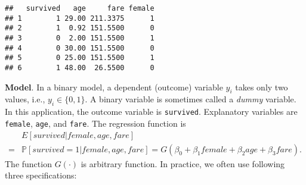 \documentclass[
  12pt,
]{article}
\newenvironment{Shaded}{\begin{snugshade}}{\end{snugshade}}
\newcommand{\DataTypeTok}[1]{\textcolor[rgb]{0.13,0.29,0.53}{#1}}
\newcommand{\DecValTok}[1]{\textcolor[rgb]{0.00,0.00,0.81}{#1}}
\newcommand{\KeywordTok}[1]{\textcolor[rgb]{0.13,0.29,0.53}{\textbf{#1}}}
\newcommand{\NormalTok}[1]{#1}
\newcommand{\OperatorTok}[1]{\textcolor[rgb]{0.81,0.36,0.00}{\textbf{#1}}}
\newcommand{\OtherTok}[1]{\textcolor[rgb]{0.56,0.35,0.01}{#1}}
\newcommand{\StringTok}[1]{\textcolor[rgb]{0.31,0.60,0.02}{#1}}
\begin{document}
\begin{Shaded}
\end{Shaded}

\begin{verbatim}
##   survived   age     fare female
## 1        1 29.00 211.3375      1
## 2        1  0.92 151.5500      0
## 3        0  2.00 151.5500      1
## 4        0 30.00 151.5500      0
## 5        0 25.00 151.5500      1
## 6        1 48.00  26.5500      0
\end{verbatim}

\noindent \textbf{Model}. In a binary model, a dependent (outcome)
variable \(y_i\) takes only two values, i.e., \(y_i \in \{0, 1\}\). A
binary variable is sometimes called a \emph{dummy} variable. In this
application, the outcome variable is \texttt{survived}. Explanatory
variables are \texttt{female}, \texttt{age}, and \texttt{fare}. The
regression function is \begin{equation*}
  \begin{split}
    &E[survived | female, age, fare] \\
    =& \mathbb{P}[survived = 1 | female, age, fare]
    = G(\beta_0 + \beta_1 female + \beta_2 age + \beta_3 fare).
  \end{split}
\end{equation*} The function \(G(\cdot)\) is arbitrary function. In
practice, we often use following three specifications:
\end{document}
